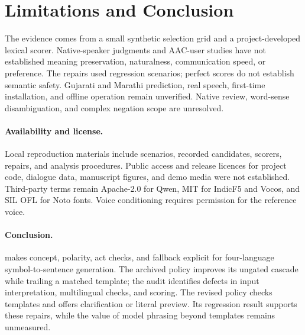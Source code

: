\section{Limitations and Conclusion}
\label{sec:limits}
The evidence comes from a small synthetic selection grid and a project-developed lexical scorer.
Native-speaker judgments and AAC-user studies have not established meaning preservation, naturalness, communication speed, or preference.
The repairs used regression scenarios; perfect scores do not establish semantic safety.
Gujarati and Marathi prediction, real speech, first-time installation, and offline operation remain unverified.
Native review, word-sense disambiguation, and complex negation scope are unresolved.

\paragraph{Availability and license.}
Local reproduction materials include scenarios, recorded candidates, scorers, repairs, and analysis procedures.
Public access and release licences for project code, dialogue data, manuscript figures, and demo media were not established.
Third-party terms remain Apache-2.0 for Qwen, MIT for IndicF5 and Vocos, and SIL OFL for Noto fonts.
Voice conditioning requires permission for the reference voice.

\paragraph{Conclusion.}
\sys{} makes concept, polarity, act checks, and fallback explicit for four-language symbol-to-sentence generation.
The archived policy improves its ungated cascade while trailing a matched template; the audit identifies defects in input interpretation, multilingual checks, and scoring.
The revised policy checks templates and offers clarification or literal preview.
Its regression result supports these repairs, while the value of model phrasing beyond templates remains unmeasured.
